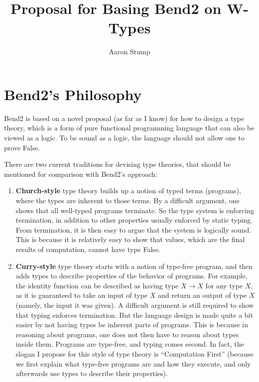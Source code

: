 \documentclass{article}
\begin{document}


\title{Proposal for Basing Bend2 on W-Types}

\author{Aaron Stump}

\maketitle

\section{Bend2's Philosophy}

Bend2 is based on a novel proposal (as far as I know) for how to
design a type theory, which is a form of pure functional programming
language that can also be viewed as a logic.  To be sound as a logic,
the language should not allow one to prove False.

There are two current traditions for devising type theories, that
should be mentioned for comparison with Bend2's approach:

\begin{enumerate}
\item \textbf{Church-style} type theory builds up a notion of typed
  terms (programs), where the types are inherent to those terms.  By a
  difficult argument, one shows that all well-typed programs
  terminate.  So the type system is enforcing termination, in addition
  to other properties usually enforced by static typing.  From
  termination, it is then easy to argue that the system is logically
  sound.  This is because it is relatively easy to show that values,
  which are the final results of computation, cannot have type False.

\item \textbf{Curry-style} type theory starts with a notion of
  type-free program, and then adds types to describe properties of the
  behavior of programs.  For example, the identity function can be
  described as having type $X \to X$ for any type $X$, as it is
  guaranteed to take an input of type $X$ and return an output of type
  $X$ (namely, the input it was given).  A difficult argument is still
  required to show that typing enforces termination.  But the language
  design is made quite a bit easier by not having types be inherent
  parts of programs.  This is because in reasoning about programs,
  one does not then have to reason about types inside them.  Programs
  are type-free, and typing comes second.  In fact, the slogan I propose
  for this style of type theory is ``Computation First'' (because we
  first explain what type-free programs are and how they execute, and
  only afterwards use types to describe their properties).
\end{enumerate}
\end{document}
